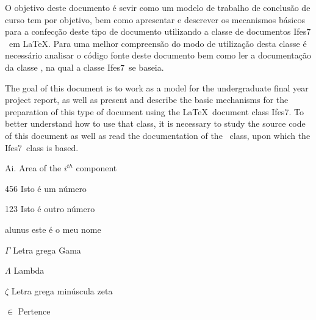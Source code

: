 \documentclass[12pt,times,a4paper,english,brazil,
chapter=TITLE,section=TITLE,subsection=TITLE]{ifes7}
\newcommand{\ifestex}{\textsf{Ifes$7$}}
\begin{document}
\begin{resumo}
  O objetivo deste documento é sevir como um modelo de trabalho de
  conclusão de curso tem por objetivo, bem como apresentar e descrever
  os mecanismos básicos para a confecção deste tipo de documento
  utilizando a classe de documentos \ifestex\ em \LaTeX.
  Para uma melhor compreensão do modo de utilização desta classe é
  necessário analisar o código fonte deste documento bem como ler a
  documentação da classe \abnTeX, na qual a classe \ifestex\ se
  baseia.
\end{resumo}

\begin{resumo}[Abstract]
  \begin{otherlanguage}{english}
    The goal of this document is to work as a model for the
    undergraduate final year project report, as well as present and
    describe the basic mechanisms for the preparation of this type of
    document using the \LaTeX\ document class \ifestex.
    To better understand how to use that class, it is necessary to
    study the source code of this document as well as read the
    documentation of the \abnTeX\ class, upon which the \ifestex\
    class is based.
  \end{otherlanguage}
\end{resumo}


\listoffigures*
\cleardoublepage


\listoftables*
\cleardoublepage


\begin{siglas}
\item[Ai.] Area of the $i^{th}$ component
\item[456] Isto é um número
\item[123] Isto é outro número
\item[alunus] este é o meu nome
\end{siglas}
\cleardoublepage


\begin{simbolos}
\item[$ \Gamma $] Letra grega Gama
\item[$ \Lambda $] Lambda
\item[$ \zeta $] Letra grega minúscula zeta
\item[$ \in $] Pertence
\end{simbolos}
\cleardoublepage
\end{document}
